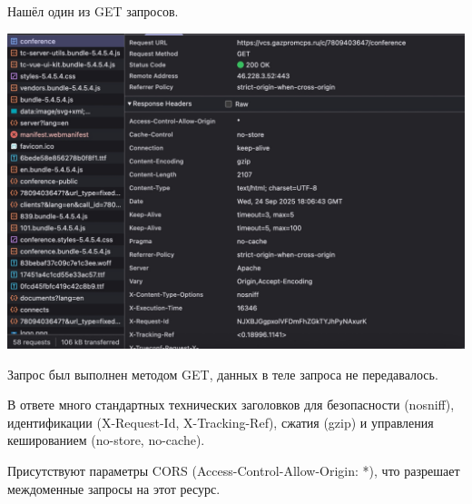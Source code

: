 \documentclass{article}
\begin{document}
Нашёл один из GET запросов.

\begin{center}
  \includegraphics[width=.9\textwidth]{8}
\end{center}

Запрос был выполнен методом GET, данных в теле запроса не передавалось.

В ответе много стандартных технических заголовков для безопасности (nosniff), идентификации (X-Request-Id, X-Tracking-Ref), сжатия (gzip) и управления кешированием (no-store, no-cache).

Присутствуют параметры CORS (Access-Control-Allow-Origin: *), что разрешает междоменные запросы на этот ресурс.
\end{document}

